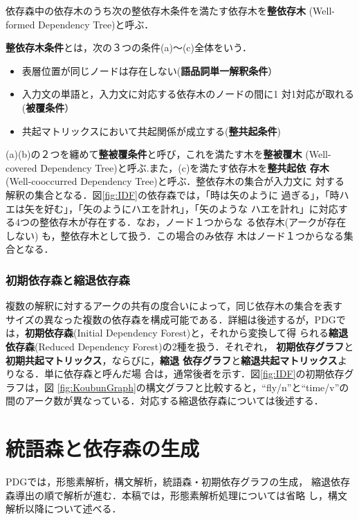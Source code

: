 依存森中の依存木のうち次の整依存木条件を満たす依存木を{\bf 整依存木}
(Well-formed Dependency Tree)と呼ぶ．
\begin{definition} \label{def:WellFormedDepTree}
{\bf 整依存木条件}とは，次の３つの条件(a)〜(c)全体をいう．
\begin{itemize}
\item[(a)]表層位置が同じノードは存在しない({\bf 語品詞単一解釈条件}）
\item[(b)]入力文の単語と，入力文に対応する依存木のノードの間に1 対1対応が取れる({\bf 被覆条件}）
\item[(c)]共起マトリックスにおいて共起関係が成立する({\bf 整共起条件})
\end{itemize}
\end{definition}
(a)(b)の２つを纏めて{\bf 整被覆条件}と呼び，これを満たす木を{\bf 整被覆木}
(Well-covered Dependency Tree)と呼ぶ.また，(c)を満たす依存木を{\bf 整共起依
存木}(Well-cooccurred Dependency Tree)と呼ぶ．整依存木の集合が入力文に
対する解釈の集合となる．図\ref{fig:IDF}の依存森では，「時は矢のように
過ぎる」，「時ハエは矢を好む」，「矢のようにハエを計れ」，「矢のような
ハエを計れ」に対応する4つの整依存木が存在する．なお，ノード１つからな
る依存木(アークが存在しない) も，整依存木として扱う．この場合のみ依存
木はノード１つからなる集合となる．


\subsubsection{初期依存森と縮退依存森}
複数の解釈に対するアークの共有の度合いによって，同じ依存木の集合を表す
サイズの異なった複数の依存森を構成可能である．詳細は後述するが，PDGで
は，{\bf 初期依存森}(Initial Dependency Forest)と，それから変換して得
られる{\bf 縮退依存森}(Reduced Dependency Forest)の2種を扱う．それぞれ，
{\bf 初期依存グラフ}と{\bf 初期共起マトリックス}，ならびに，{\bf 縮退
依存グラフ}と{\bf 縮退共起マトリックス}よりなる．単に依存森と呼んだ場
合は，通常後者を示す．図\ref{fig:IDF}の初期依存グラフは，図
\ref{fig:KoubunGraph}の構文グラフと比較すると，``fly/n''と``time/v''の
間のアーク数が異なっている．対応する縮退依存森については後述する．

\section{統語森と依存森の生成}\label{sec:construction}

PDGでは，形態素解析，構文解析，統語森・初期依存グラフの生成，
縮退依存森導出の順で解析が進む．本稿では，形態素解析処理については省略
し，構文解析以降について述べる．

